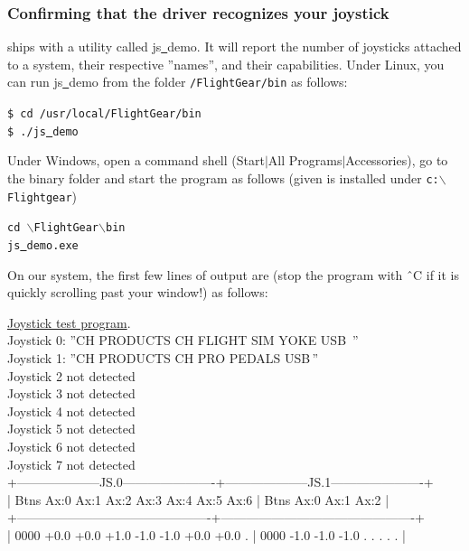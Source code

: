 \subsubsection{Confirming that the driver recognizes your joystick\label{confirming}}
\FlightGear{} ships with a utility called js\underline{~}demo. It will report the number of joysticks attached to a system, their respective ''names'', and their capabilities. Under Linux, you can run js\underline{~}demo from the folder \texttt{/FlightGear/bin} as follows:
\medskip

\noindent
	\texttt{\$ cd /usr/local/FlightGear/bin}\\	
	\texttt{\$ ./js\underline{~}demo}
\medskip

\noindent
Under Windows, open a command shell (Start$\left|\right.$All Programs$\left|\right.$Accessories), go to the \FlightGear{} binary folder and start the program as follows (given \FlightGear{} is installed under \texttt{c:$\backslash$Flightgear})
\medskip

\noindent
	\texttt{cd {$\backslash$}FlightGear{$\backslash$}bin}\\	
	\texttt{js\underline{~}demo.exe}
\medskip

On our system, the first few lines of output are (stop the program with \^{~}C if it is quickly scrolling  past your window!) as follows:
\medskip

\begin{ttfamily}
\tiny
\noindent
\underline{Joystick test program}.\\
Joystick 0: ''CH PRODUCTS CH FLIGHT SIM YOKE USB\, ''\\
Joystick 1: ''CH PRODUCTS CH PRO PEDALS USB\,''\\
Joystick 2 not detected\\
Joystick 3 not detected\\
Joystick 4 not detected\\
Joystick 5 not detected\\
Joystick 6 not detected\\
Joystick 7 not detected\\
+--------------------JS.0----------------------+--------------------JS.1----------------------+\\
| Btns Ax:0 Ax:1 Ax:2 Ax:3 Ax:4 Ax:5 Ax:6      | Btns Ax:0 Ax:1 Ax:2                          |\\
+----------------------------------------------+----------------------------------------------+\\
| 0000 +0.0 +0.0 +1.0 -1.0 -1.0 +0.0 +0.0   .  | 0000 -1.0 -1.0 -1.0   .    .    .    .    .  |\\
\end{ttfamily}

